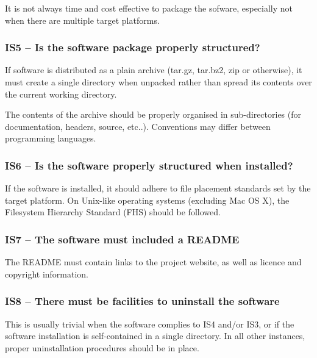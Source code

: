 \documentclass[a4paper,11pt]{article}
\begin{document}
It is not always time and cost effective to package the sofware, especially not
when there are multiple target platforms. 

\subsubsection{IS5 -- Is the software package properly structured?}

If software is distributed as a plain archive (tar.gz, tar.bz2, zip or otherwise),
it must create a single directory when unpacked rather than spread its contents
over the current working directory.

The contents of the archive should be properly organised in sub-directories
(for documentation, headers, source, etc..). Conventions may differ between
programming languages.

\subsubsection{IS6 -- Is the software properly structured when installed?}

If the software is installed, it should adhere to file placement standards set
by the target platform. On Unix-like operating systems (excluding Mac OS X), the Filesystem
Hierarchy Standard (FHS) should be followed.

\subsubsection{IS7 -- The software must included a README}

The README must contain links to the project website, as well as licence and copyright
information.

\subsubsection{IS8 -- There must be facilities to uninstall the software}

This is usually trivial when the software complies to IS4 and/or IS3, or if the
software installation is self-contained in a single directory. In all other
instances, proper uninstallation procedures should be in place.
\end{document}

